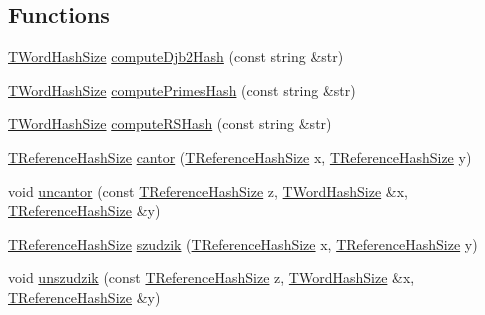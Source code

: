 \subsection*{Functions}
\begin{DoxyCompactItemize}
\item 
\hyperlink{namespaceuva_1_1smt_1_1hashing_acdc1f2765e669283f8e9c1ed42705314}{T\+Word\+Hash\+Size} \hyperlink{namespaceuva_1_1smt_1_1hashing_a8ac196e26b372b4716effe395c3cbb1c}{compute\+Djb2\+Hash} (const string \&str)
\item 
\hyperlink{namespaceuva_1_1smt_1_1hashing_acdc1f2765e669283f8e9c1ed42705314}{T\+Word\+Hash\+Size} \hyperlink{namespaceuva_1_1smt_1_1hashing_a390d782fb4e4723b565577a85d5bc8bd}{compute\+Primes\+Hash} (const string \&str)
\item 
\hyperlink{namespaceuva_1_1smt_1_1hashing_acdc1f2765e669283f8e9c1ed42705314}{T\+Word\+Hash\+Size} \hyperlink{namespaceuva_1_1smt_1_1hashing_a0ccb220ca55a85d4238d2f8ca287a76f}{compute\+R\+S\+Hash} (const string \&str)
\item 
\hyperlink{namespaceuva_1_1smt_1_1hashing_a6cc10b288b11b76c718a898b022fbdd1}{T\+Reference\+Hash\+Size} \hyperlink{namespaceuva_1_1smt_1_1hashing_ad2b30c50e6db131c94fb813153100c9c}{cantor} (\hyperlink{namespaceuva_1_1smt_1_1hashing_a6cc10b288b11b76c718a898b022fbdd1}{T\+Reference\+Hash\+Size} x, \hyperlink{namespaceuva_1_1smt_1_1hashing_a6cc10b288b11b76c718a898b022fbdd1}{T\+Reference\+Hash\+Size} y)
\item 
void \hyperlink{namespaceuva_1_1smt_1_1hashing_aa6b9f5792fc3efa9e1f04466569b5404}{uncantor} (const \hyperlink{namespaceuva_1_1smt_1_1hashing_a6cc10b288b11b76c718a898b022fbdd1}{T\+Reference\+Hash\+Size} z, \hyperlink{namespaceuva_1_1smt_1_1hashing_acdc1f2765e669283f8e9c1ed42705314}{T\+Word\+Hash\+Size} \&x, \hyperlink{namespaceuva_1_1smt_1_1hashing_a6cc10b288b11b76c718a898b022fbdd1}{T\+Reference\+Hash\+Size} \&y)
\item 
\hyperlink{namespaceuva_1_1smt_1_1hashing_a6cc10b288b11b76c718a898b022fbdd1}{T\+Reference\+Hash\+Size} \hyperlink{namespaceuva_1_1smt_1_1hashing_afe883e418ca19024fe820ef2fb4ade8a}{szudzik} (\hyperlink{namespaceuva_1_1smt_1_1hashing_a6cc10b288b11b76c718a898b022fbdd1}{T\+Reference\+Hash\+Size} x, \hyperlink{namespaceuva_1_1smt_1_1hashing_a6cc10b288b11b76c718a898b022fbdd1}{T\+Reference\+Hash\+Size} y)
\item 
void \hyperlink{namespaceuva_1_1smt_1_1hashing_a6c6735ddab6518f2a947ef0373722fd4}{unszudzik} (const \hyperlink{namespaceuva_1_1smt_1_1hashing_a6cc10b288b11b76c718a898b022fbdd1}{T\+Reference\+Hash\+Size} z, \hyperlink{namespaceuva_1_1smt_1_1hashing_acdc1f2765e669283f8e9c1ed42705314}{T\+Word\+Hash\+Size} \&x, \hyperlink{namespaceuva_1_1smt_1_1hashing_a6cc10b288b11b76c718a898b022fbdd1}{T\+Reference\+Hash\+Size} \&y)
\end{DoxyCompactItemize}


